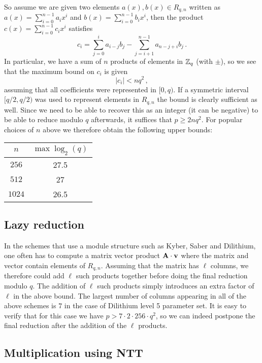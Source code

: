 So assume we are given two elements  $a(x), b(x) \in R_{q,n}$ written as $a(x) = \sum_{i = 0}^{n-1} a_i x^i$
and $b(x) = \sum_{i = 0}^{n-1} b_i x^i$, then the product $c(x) = \sum_{i = 0}^{n-1} c_i x^i$ satisfies
\[  c_i = \sum_{j = 0}^{i} a_{i -j} b_j  - \sum_{j = i+1}^{n-1} a_{n-j+i} b_{j}  \, . \]
In particular, we have a sum of $n$ products of elements
in $\mathbb{Z}_q$ (with $\pm$), so we see that the maximum bound on $c_i$ is given 
\[ |c_i| < n q^2 \, , \]
assuming that all coefficients were represented in $[0,q)$.  If a symmetric interval $[q/2, q/2)$ was used to 
represent elements in $R_{q, n}$ the bound is clearly sufficient as well.  
Since we need to be able to recover this as an integer (it can be negative) to be able to reduce modulo $q$ afterwards,
it suffices that $p \geq 2 n q^2$.  For popular choices of $n$ above we therefore obtain the following upper bounds:
\begin{center}
\begin{tabular}{|c|c|}
\hline
$n$ & $\max \log_2(q)$ \\
\hline
$256$ &  27.5 \\
$512$ &   27 \\
$1024$ &   26.5 \\
\hline
\end{tabular}
\end{center}

\subsection{Lazy reduction} In the schemes that use a module structure such as Kyber, Saber and Dilithium, 
one often has to compute 
a matrix vector product $\mathbf{A} \cdot \mathbf{v}$ where the matrix and vector contain elements of $R_{q,n}$.
Assuming that the matrix has $\ell$ columns, we therefore could add $\ell$ such products together before
doing the final reduction modulo $q$.  The addition of $\ell$ such products simply introduces an extra 
factor of $\ell$ in the above bound.  The largest number of columns appearing in all of the above schemes
is $7$ in the case of Dilithium level 5 parameter set.  It is easy to verify that for this case we have
$p > 7 \cdot 2 \cdot 256 \cdot q^2$, so we can indeed postpone the final reduction after the addition 
of the $\ell$ products.

\subsection{Multiplication using NTT}
\label{section:multiplication-using-ntt}

